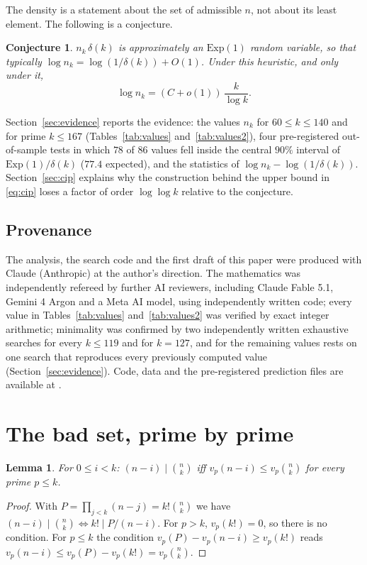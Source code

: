 \documentclass[11pt]{amsart}
\newtheorem{lemma}[theorem]{Lemma}
\newtheorem{conjecture}[theorem]{Conjecture}
\theoremstyle{remark}
\newcommand{\Exp}{\mathrm{Exp}}
\begin{document}
The density is a statement about the set of admissible $n$, not about its least element. The following is a conjecture.

\begin{conjecture}\label{conj}
$n_k\,\delta(k)$ is approximately an $\Exp(1)$ random variable, so that typically $\log n_k=\log(1/\delta(k))+O(1)$. Under this heuristic, and only under it,
\[\log n_k=(C+o(1))\,\frac{k}{\log k}.\]
\end{conjecture}

Section~\ref{sec:evidence} reports the evidence: the values $n_k$ for $60\le k\le140$ and for prime $k\le167$ (Tables~\ref{tab:values} and~\ref{tab:values2}), four pre-registered out-of-sample tests in which $78$ of $86$ values fell inside the central $90\%$ interval of $\Exp(1)/\delta(k)$ ($77.4$ expected), and the statistics of $\log n_k-\log(1/\delta(k))$. Section~\ref{sec:cip} explains why the construction behind the upper bound in \eqref{eq:cip} loses a factor of order $\log\log k$ relative to the conjecture.

\subsection*{Provenance}
The analysis, the search code and the first draft of this paper were produced with Claude (Anthropic) at the author's direction. The mathematics was independently refereed by further AI reviewers, including Claude Fable 5.1, Gemini 4 Argon and a Meta AI model, using independently written code; every value in Tables~\ref{tab:values} and~\ref{tab:values2} was verified by exact integer arithmetic; minimality was confirmed by two independently written exhaustive searches for every $k\le119$ and for $k=127$, and for the remaining values rests on one search that reproduces every previously computed value (Section~\ref{sec:evidence}). Code, data and the pre-registered prediction files are available at \cite{code}.

\section{The bad set, prime by prime}\label{sec:local}

\begin{lemma}\label{lem:1}
For $0\le i<k$: $(n-i)\mid\binom nk$ iff $v_p(n-i)\le v_p\binom nk$ for every prime $p\le k$.
\end{lemma}
\begin{proof}
With $P=\prod_{j<k}(n-j)=k!\binom nk$ we have $(n-i)\mid\binom nk\iff k!\mid P/(n-i)$. For $p>k$, $v_p(k!)=0$, so there is no condition. For $p\le k$ the condition $v_p(P)-v_p(n-i)\ge v_p(k!)$ reads $v_p(n-i)\le v_p(P)-v_p(k!)=v_p\binom nk$.
\end{proof}
\end{document}
